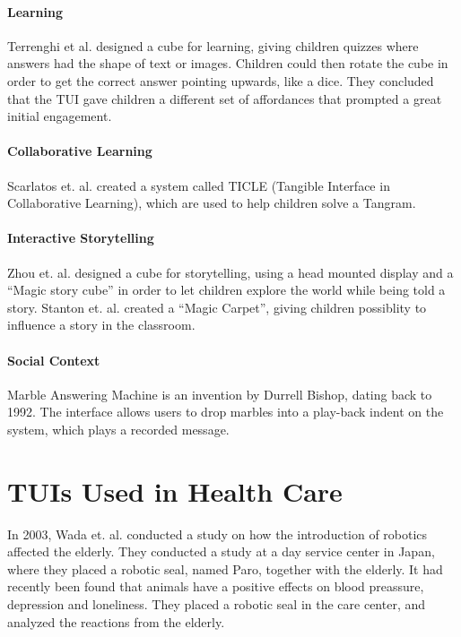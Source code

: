\paragraph{Learning}
Terrenghi et al. designed a cube for learning, giving children quizzes where answers had the shape of text or images\cite{terrenghi2006cube}. Children could then rotate the cube in order to get the correct answer pointing upwards, like a dice. They concluded that the TUI gave children a different set of affordances that prompted a great initial engagement\cite{terrenghi2006cube}. 

\paragraph{Collaborative Learning}
Scarlatos et. al. created a system called TICLE (Tangible Interface in Collaborative Learning), which are used to help children solve a Tangram\cite{scarlatos1999ticle}.  


\paragraph{Interactive Storytelling}
Zhou et. al. designed a cube for storytelling, using a head mounted display and a ``Magic story cube'' in order to let children explore the world while being told a story\cite{zhou2004magic}. Stanton et. al. created a ``Magic Carpet'', giving children possiblity to influence a story in the classroom\cite{stanton2001classroom}. 

 
\paragraph{Social Context}
Marble Answering Machine is an invention by Durrell Bishop, dating back to 1992\cite{crampton1995hand}. The interface allows users to drop marbles into a play-back indent on the system, which plays a recorded message.   


\section{TUIs Used in Health Care}
\label{sec:effectofrobots}
In 2003, Wada et. al. conducted a study on how the introduction of robotics affected the elderly\cite{wada2004effects}. They conducted a study at a day service center in Japan, where they placed a robotic seal, named Paro, together with the elderly. It had recently been found that animals have a positive effects on blood preassure, depression and loneliness. They placed a robotic seal in the care center, and analyzed the reactions from the elderly. 

